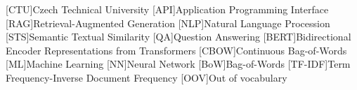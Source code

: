 
\begin{acronym}
  [CTU]{Czech Technical University}
  [API]{Application Programming Interface}
  [RAG]{Retrieval-Augmented Generation}
  [NLP]{Natural Language Procession}
  [STS]{Semantic Textual Similarity}
  [QA]{Question Answering}
  [BERT]{Bidirectional Encoder Representations from Transformers}
  [CBOW]{Continuous Bag-of-Words}
  [ML]{Machine Learning}
  [NN]{Neural Network}
  [BoW]{Bag-of-Words}
  [TF-IDF]{Term Frequency-Inverse Document Frequency}
  [OOV]{Out of vocabulary}
\end{acronym}
